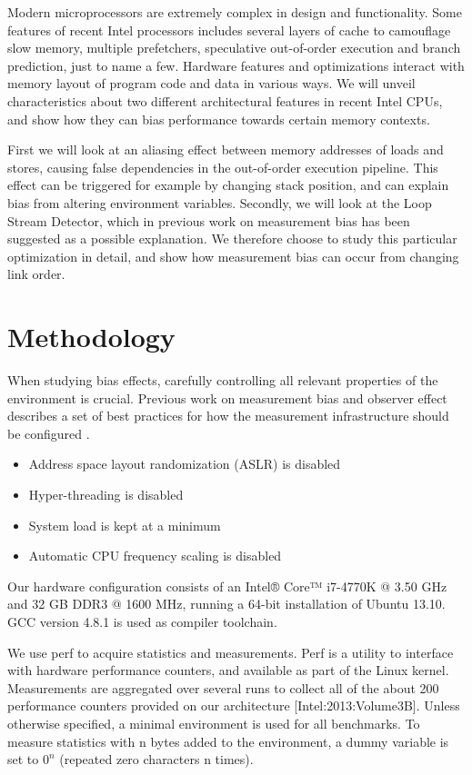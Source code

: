 \documentclass[a4paper,10pt,twocolumn,twoside]{article}
\begin{document}
Modern microprocessors are extremely complex in design and functionality. 
Some features of recent Intel processors includes several layers of cache to camouflage slow memory, multiple prefetchers, speculative out-of-order execution and branch prediction, just to name a few.
Hardware features and optimizations interact with memory layout of program code and data in various ways.
We will unveil characteristics about two different architectural features in recent Intel CPUs, and show how they can bias performance towards certain memory contexts. 

First we will look at an aliasing effect between memory addresses of loads and stores, causing false dependencies in the out-of-order execution pipeline. 
This effect can be triggered for example by changing stack position, and can explain bias from altering environment variables. 
Secondly, we will look at the Loop Stream Detector, which in previous work on measurement bias has been suggested as a possible explanation.
We therefore choose to study this particular optimization in detail, and show how measurement bias can occur from changing link order.


\section{Methodology}
When studying bias effects, carefully controlling all relevant properties of the environment is crucial. 
Previous work on measurement bias and observer effect describes a set of best practices for how the measurement infrastructure should be configured \cite{Mytkowicz:2009:WrongData, Mytkowicz:2008:OE&MB}. 
\begin{itemize}
  \item Address space layout randomization (ASLR) is disabled
  \item Hyper-threading is disabled
  \item System load is kept at a minimum
  \item Automatic CPU frequency scaling is disabled
\end{itemize}
Our hardware configuration consists of an Intel® Core™ i7-4770K @ 3.50 GHz and 32 GB DDR3 @ 1600 MHz, running a 64-bit installation of Ubuntu 13.10. GCC version 4.8.1 is used as compiler toolchain.

We use perf to acquire statistics and measurements.
Perf is a utility to interface with hardware performance counters, and available as part of the Linux kernel.
Measurements are aggregated over several runs to collect all of the about 200 performance counters provided on our architecture [Intel:2013:Volume3B]. 
Unless otherwise specified, a minimal environment is used for all benchmarks. 
To measure statistics with n bytes added to the environment, a dummy variable is set to \(0^{n}\) (repeated zero characters n times).
\end{document}
